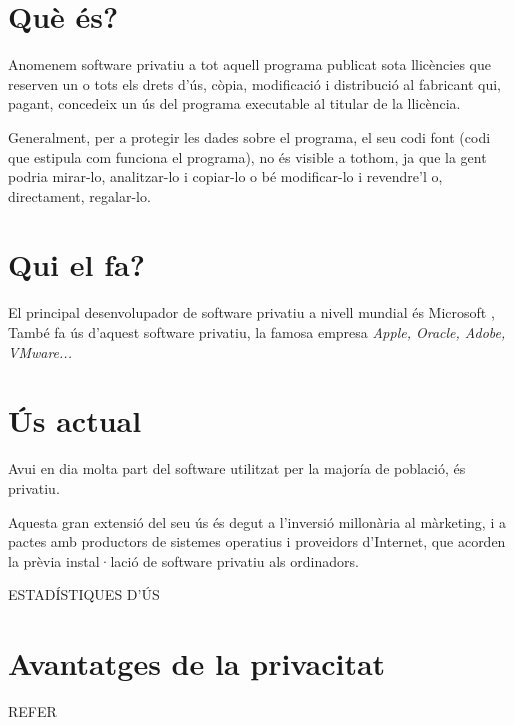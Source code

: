 \section{Què és?}

Anomenem software privatiu a tot aquell programa publicat sota llicències
que reserven un o tots els drets d'ús, còpia, modificació i distribució
al fabricant qui, pagant, concedeix un ús del programa executable al titular
de la llicència.

Generalment, per a protegir les dades sobre el programa, el seu codi font
(codi que estipula com funciona el programa), no és visible a tothom, ja 
que la gent podria mirar-lo, analitzar-lo i copiar-lo o bé modificar-lo i
revendre'l o, directament, regalar-lo. \cite{wikipediapropietari}\cite{gnucategories}

\section{Qui el fa?}

El principal desenvolupador de software privatiu a nivell mundial és Microsoft
\cite{gnumicrosoft}, 
També fa ús d'aquest software privatiu, la famosa empresa \emph{Apple, Oracle, Adobe,
VMware...}

\section{Ús actual}

Avui en dia molta part del software utilitzat per la majoría de població, és privatiu.

Aquesta gran extensió del seu ús és degut a l'inversió millonària al màrketing, i a
pactes amb productors de sistemes operatius i proveidors d'Internet, que acorden la
prèvia instal·lació de software privatiu als ordinadors.

ESTADÍSTIQUES D'ÚS

\section{Avantatges de la privacitat}

REFER


